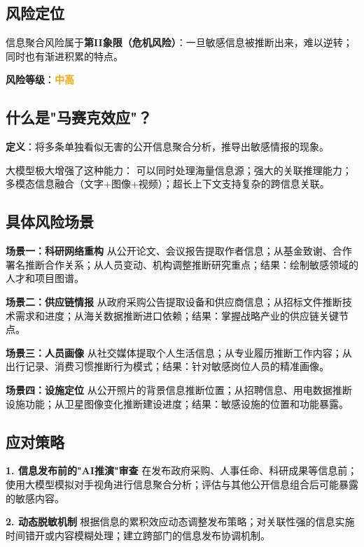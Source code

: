 \subsection{风险定位}

信息聚合风险属于\textbf{第II象限（危机风险）}：一旦敏感信息被推断出来，难以逆转；同时也有渐进积累的特点。

\textbf{风险等级}：\textcolor{orange}{\textbf{中高}}

\subsection{什么是"马赛克效应"？}

\textbf{定义}：将多条单独看似无害的公开信息聚合分析，推导出敏感情报的现象。

大模型极大增强了这种能力：
可以同时处理海量信息源；强大的关联推理能力；多模态信息融合（文字+图像+视频）；超长上下文支持复杂的跨信息关联。

\subsection{具体风险场景}

\textbf{场景一：科研网络重构}
从公开论文、会议报告提取作者信息；从基金致谢、合作署名推断合作关系；从人员变动、机构调整推断研究重点；结果：绘制敏感领域的人才和项目图谱。

\textbf{场景二：供应链情报}
从政府采购公告提取设备和供应商信息；从招标文件推断技术需求和进度；从海关数据推断进口依赖；结果：掌握战略产业的供应链关键节点。

\textbf{场景三：人员画像}
从社交媒体提取个人生活信息；从专业履历推断工作内容；从出行记录、消费习惯推断行为模式；结果：针对敏感岗位人员的精准画像。

\textbf{场景四：设施定位}
从公开照片的背景信息推断位置；从招聘信息、用电数据推断设施功能；从卫星图像变化推断建设进度；结果：敏感设施的位置和功能暴露。

\subsection{应对策略}

\textbf{1. 信息发布前的"AI推演"审查}
在发布政府采购、人事任命、科研成果等信息前；使用大模型模拟对手视角进行信息聚合分析；评估与其他公开信息组合后可能暴露的敏感内容。

\textbf{2. 动态脱敏机制}
根据信息的累积效应动态调整发布策略；对关联性强的信息实施时间错开或内容模糊处理；建立跨部门的信息发布协调机制。

